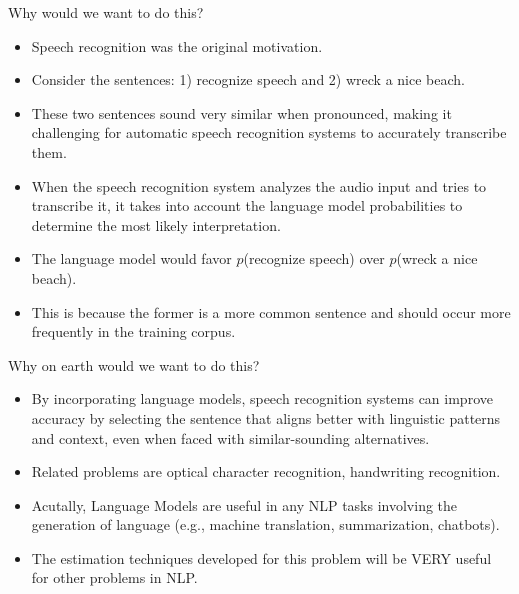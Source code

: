 \documentclass[handout]{beamer}
\begin{document}
\begin{frame}{Why would we want to do this?}

\begin{scriptsize}
\begin{itemize}
\item Speech recognition was the original motivation.

\item Consider the sentences: 1) recognize speech and 2) wreck a nice beach.

\item   These two sentences sound very similar when pronounced, making it challenging for automatic speech recognition systems to accurately transcribe them.
    
    
\item When the speech recognition system analyzes the audio input and tries to transcribe it, it takes into account the language model probabilities to determine the most likely interpretation.
    
\item The language model would favor $p$(recognize speech) over $p$(wreck a nice beach).

\item This is because the former is a more common sentence and should occur more frequently in the training corpus.
    

\end{itemize}
\end{scriptsize}

\end{frame}

\begin{frame}{Why on earth would we want to do this?}

\begin{scriptsize}
\begin{itemize}

\item By incorporating language models, speech recognition systems can improve accuracy by selecting the sentence that aligns better with linguistic patterns and context, even when faced with similar-sounding alternatives.



\item Related problems are optical character recognition, handwriting recognition.

\item Acutally, Language Models are useful in any NLP tasks involving the generation of language (e.g., machine translation, summarization, chatbots).

\item The estimation techniques developed for this problem will be VERY useful for other problems in NLP.


\end{itemize}
\end{scriptsize}

\end{frame}
\end{document}
